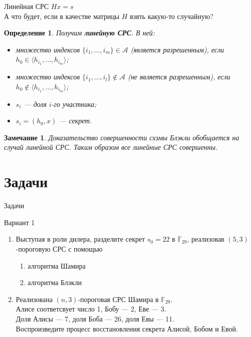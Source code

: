 \documentclass{beamer}
\newtheorem{define}{Определение}
\newtheorem{Note}{Замечание}
\begin{document}
\begin{frame}{Линейная СРС}
    \(Hx = s\) \\
    А что будет, если в качестве матрицы \(H\) взять какую-то случайную? \\
    \begin{define}
    Получим \textbf{линейную СРС}. В ней:
    \begin{itemize}
        \item множество индексов \(\{ i_1, \dots, i_m \} \in \mathcal{A}\) (является разрешенным), если \(h_0 \in \langle h_{i_1}, \dots, h_{i_m} \rangle \);
        \item множество индексов \(\{ i_1, \dots, i_l \} \not\in \mathcal{A}\) (не является разрешенным), если \(h_0 \not\in \langle h_{i_1}, \dots, h_{i_m} \rangle \);
        \item \(s_i\) --- доля \(i\)-го участника;
        \item \(s_i = (h_0, x)\) --- секрет.
    \end{itemize}
    \end{define}
    
    \begin{Note}
        Доказательство совершенности схэмы Блэкли обобщается на случай линейной СРС. Таким образом все линейные СРС совершенны.
    \end{Note}
\end{frame}

\section{Задачи}
\begin{frame}{Задачи}
    \begin{center}
        Вариант 1
    \end{center}
    \begin{enumerate}
        \item Выступая в роли дилера, разделите секрет \(s_0 = 22\) в \(\mathbb{F}_{29}\), реализовав \((5, 3)\)-пороговую СРС с помощью
        \begin{enumerate}
            \item алгоритма Шамира
            \item алгоритма Блэкли
        \end{enumerate}
        \item Реализована \((n, 3)\)-пороговая СРС Шамира в \(\mathbb{F}_{29}\). \\
        Алисе соответсвует число 1, Бобу --- 2, Еве --- 3. \\
        Доля Алисы --- 7, доля Боба --- 26, доля Евы --- 11. \\
        Воспроизведите процесс восстановления секрета Алисой, Бобом и Евой.
    \end{enumerate}
\end{frame}
\end{document}
